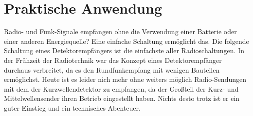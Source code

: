 

\section*{Praktische Anwendung}


Radio- und Funk-Signale empfangen ohne die Verwendung einer Batterie oder einer
anderen Energiequelle? Eine einfache Schaltung ermöglicht das. Die folgende
Schaltung eines Detektorempfängers ist die einfachste aller Radioschaltungen. In
der Frühzeit der Radiotechnik war das Konzept eines Detektorempfänger durchaus
verbreitet, da es den Rundfunkempfang mit wenigen Bauteilen ermöglichst. Heute
ist es leider nich mehr ohne weiters möglich Radio-Sendungen mit dem der
Kurzwellendetektor zu empfangen, da der Großteil der Kurz- und
Mittelwellensender ihren Betrieb eingestellt haben. Nichts desto trotz ist er
ein guter Einstieg und ein technisches Abenteuer.

